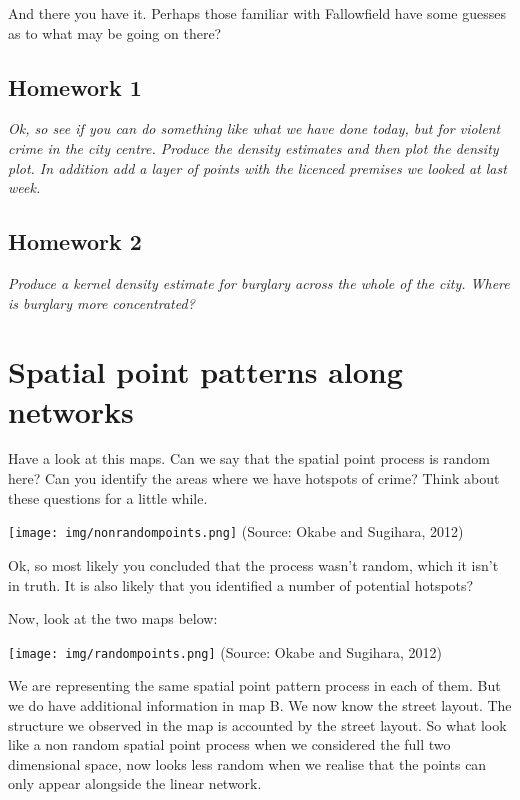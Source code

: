 \documentclass[]{book}
\begin{document}
\hypertarget{htmlwidget-7960c5a03896f5927cdd}{}

And there you have it. Perhaps those familiar with Fallowfield have some guesses as to what may be going on there?

\hypertarget{homework-1-1}{%
\subsection{Homework 1}\label{homework-1-1}}

\emph{Ok, so see if you can do something like what we have done today, but for violent crime in the city centre. Produce the density estimates and then plot the density plot. In addition add a layer of points with the licenced premises we looked at last week.}

\hypertarget{homework-2-2}{%
\subsection{Homework 2}\label{homework-2-2}}

\emph{Produce a kernel density estimate for burglary across the whole of the city. Where is burglary more concentrated?}

\hypertarget{spatial-point-patterns-along-networks}{%
\section{Spatial point patterns along networks}\label{spatial-point-patterns-along-networks}}

Have a look at this maps. Can we say that the spatial point process is random here? Can you identify the areas where we have hotspots of crime? Think about these questions for a little while.

\texttt{[image: img/nonrandompoints.png]}
(Source: Okabe and Sugihara, 2012)

Ok, so most likely you concluded that the process wasn't random, which it isn't in truth. It is also likely that you identified a number of potential hotspots?

Now, look at the two maps below:

\texttt{[image: img/randompoints.png]}
(Source: Okabe and Sugihara, 2012)

We are representing the same spatial point pattern process in each of them. But we do have additional information in map B. We now know the street layout. The structure we observed in the map is accounted by the street layout. So what look like a non random spatial point process when we considered the full two dimensional space, now looks less random when we realise that the points can only appear alongside the linear network.
\end{document}
